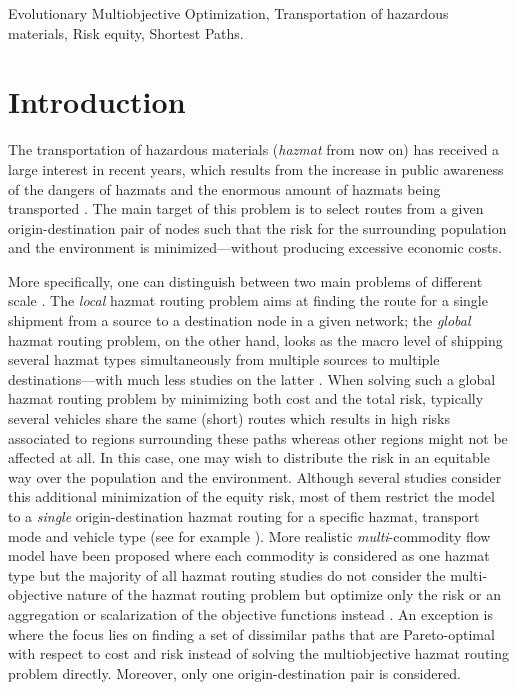 \documentclass[preprint,12pt]{elsarticle}
\begin{document}
\begin{frontmatter}
\begin{keyword}
Evolutionary Multiobjective Optimization, Transportation of hazardous materials, Risk equity, Shortest Paths. 
\end{keyword}

\end{frontmatter}


\section{Introduction}
The transportation of hazardous materials ({\em hazmat} from now on) has received a large interest in recent years, which results from the increase in public awareness of the dangers of hazmats and the enormous amount of hazmats being transported \citep{etv2007a,cd2008a}. The main target of this problem is to select routes from a given origin-destination pair of nodes such that the risk for the surrounding population and the environment is minimized---without producing excessive economic costs. 

More specifically, one can distinguish between two main problems of different scale \citep{etv2007a}. The \emph{local} hazmat routing problem aims at finding the route for a single shipment from a source to a destination node in a given network; the \emph{global} hazmat routing problem, on the other hand, looks as the macro level of shipping several hazmat types simultaneously from multiple sources to multiple destinations---with much less studies on the latter \citep{etc2007a}. 
When solving such a global hazmat routing problem by minimizing both cost and the total risk, typically several vehicles share the same (short) routes which results in high risks associated to regions surrounding these paths whereas other regions might not be affected at all. In this case, one may wish to distribute the risk in an equitable way over the population and the environment. Although several studies consider this additional minimization of the equity risk, most of them restrict the model to a \emph{single} origin-destination hazmat routing for a specific hazmat, transport mode and vehicle type (see for example \cite{aeb2000a}).
More realistic \emph{multi}-commodity flow model have been proposed where each commodity is considered as one hazmat type \citep{cd2008a} but the majority of all hazmat routing studies do not consider the multi-objective nature of the hazmat routing problem but optimize only the risk \cite{gkbk1990a} or an aggregation or scalarization of the objective functions instead \citep{cd2008a}. An exception is \citep{dgs2005a} where the focus lies on finding a set of dissimilar paths that are Pareto-optimal with respect to cost and risk instead of solving the multiobjective hazmat routing problem directly. Moreover, only one origin-destination pair is considered.
\end{document}

